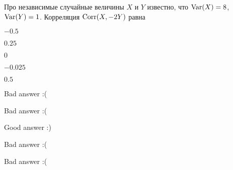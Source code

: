 
\begin{question}
Про независимые случайные величины \(X\) и \(Y\) известно, что
\(\operatorname{Var}(X)=8\), \(\operatorname{Var}(Y)=1\). Корреляция \(\operatorname{Corr}(X,-2Y)\) равна
\begin{answerlist}
  \item \(-0.5\)
  \item \(0.25\)
  \item \(0\)
  \item \(-0.025\)
  \item \(0.5\)
\end{answerlist}
\end{question}

\begin{solution}
\begin{answerlist}
  \item Bad answer :(
  \item Bad answer :(
  \item Good answer :)
  \item Bad answer :(
  \item Bad answer :(
\end{answerlist}
\end{solution}

